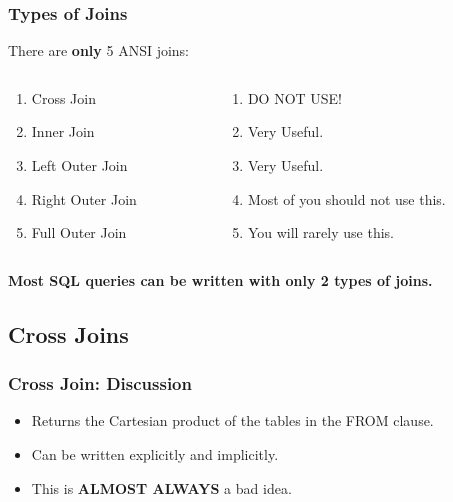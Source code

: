 \documentclass{beamer}
\begin{document}
\begin{frame} %
  \frametitle{Types of Joins}

  There are \textbf{only} 5 ANSI joins:

  \smallskip

  \begin{columns}

    \begin{column}{.5\textwidth}
      \begin{enumerate}
      \item Cross Join
      \item Inner Join
      \item Left Outer Join
      \item Right Outer Join
      \item Full Outer Join
      \end{enumerate}
    \end{column}
    
    \begin{column}{.5\textwidth}
        \begin{enumerate}
        \item DO NOT USE!
        \item Very Useful.
        \item Very Useful.
        \item Most of you should not use this.
        \item You will rarely use this.
        \end{enumerate}
    \end{column}

  \end{columns}

  \bigskip
  \textbf{Most SQL queries can be written with only 2 types of joins.}

\end{frame}  

\subsection{Cross Joins} %

\begin{frame} %
  \frametitle{Cross Join: Discussion}
  \begin{itemize}
  \item Returns the Cartesian product of the tables in the FROM
    clause. 
  \item Can be written explicitly and implicitly.
  \item This is \textbf{ALMOST ALWAYS} a bad idea.
  \end{itemize}
\end{frame}
\end{document}
